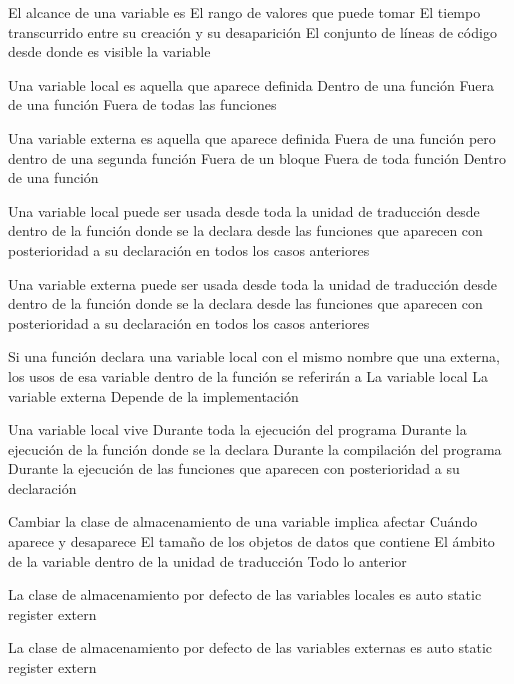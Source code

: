 
\question El alcance de una variable es
\choice El rango de valores que puede tomar
\choice El tiempo transcurrido entre su creación y su desaparición
\correctchoice El conjunto de líneas de código desde donde es visible la variable

\question Una variable local es aquella que aparece definida
\correctchoice Dentro de una función
\choice Fuera de una función
\choice Fuera de todas las funciones

\question Una variable externa es aquella que aparece definida
\choice Fuera de una función pero dentro de una segunda función
\choice Fuera de un bloque
\correctchoice Fuera de toda función
\choice Dentro de una función

\question Una variable local puede ser usada
\choice desde toda la unidad de traducción
\correctchoice desde dentro de la función donde se la declara
\choice desde las funciones que aparecen con posterioridad a su declaración
\choice en todos los casos anteriores

\question Una variable externa puede ser usada
\choice desde toda la unidad de traducción
\choice desde dentro de la función donde se la declara
\correctchoice desde las funciones que aparecen con posterioridad a su declaración
\choice en todos los casos anteriores

\question Si una función declara una variable local con el mismo nombre que una externa, los usos de esa variable dentro de la función se referirán a
\correctchoice La variable local 
\choice La variable externa
\choice Depende de la implementación

\question Una variable local vive 
\choice Durante toda la ejecución del programa
\correctchoice Durante la ejecución de la función donde se la declara
\choice Durante la compilación del programa
\choice Durante la ejecución de las funciones que aparecen con posterioridad a su declaración

\question Cambiar la clase de almacenamiento de una variable implica afectar 
\correctchoice Cuándo aparece y desaparece
\choice El tamaño de los objetos de datos que contiene
\choice El ámbito de la variable dentro de la unidad de traducción
\choice Todo lo anterior

\question La clase de almacenamiento por defecto de las variables locales es
\correctchoice auto
\choice static
\choice register
\choice extern

\question La clase de almacenamiento por defecto de las variables externas es
\choice auto
\correctchoice static
\choice register
\choice extern

